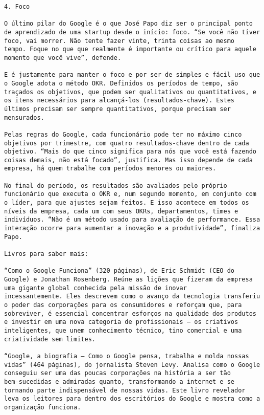 \begin{verbatim}
4. Foco

O último pilar do Google é o que José Papo diz ser o principal ponto
de aprendizado de uma startup desde o início: foco. “Se você não tiver
foco, vai morrer. Não tente fazer vinte, trinta coisas ao mesmo
tempo. Foque no que que realmente é importante ou crítico para aquele
momento que você vive”, defende.

E é justamente para manter o foco e por ser de simples e fácil uso que
o Google adota o método OKR. Definidos os períodos de tempo, são
traçados os objetivos, que podem ser qualitativos ou quantitativos, e
os itens necessários para alcançá-los (resultados-chave). Estes
últimos precisam ser sempre quantitativos, porque precisam ser
mensurados.

Pelas regras do Google, cada funcionário pode ter no máximo cinco
objetivos por trimestre, com quatro resultados-chave dentro de cada
objetivo. “Mais do que cinco significa para nós que você está fazendo
coisas demais, não está focado”, justifica. Mas isso depende de cada
empresa, há quem trabalhe com períodos menores ou maiores.

No final do período, os resultados são avaliados pelo próprio
funcionário que executa o OKR e, num segundo momento, em conjunto com
o líder, para que ajustes sejam feitos. E isso acontece em todos os
níveis da empresa, cada um com seus OKRs, departamentos, times e
indivíduos. “Não é um método usado para avaliação de performance. Essa
interação ocorre para aumentar a inovação e a produtividade”, finaliza
Papo.

Livros para saber mais:

“Como o Google Funciona” (320 páginas), de Eric Schmidt (CEO do
Google) e Jonathan Rosenberg. Reúne as lições que fizeram da empresa
uma gigante global conhecida pela missão de inovar
incessantemente. Eles descrevem como o avanço da tecnologia transferiu
o poder das corporações para os consumidores e reforçam que, para
sobreviver, é essencial concentrar esforços na qualidade dos produtos
e investir em uma nova categoria de profissionais – os criativos
inteligentes, que unem conhecimento técnico, tino comercial e uma
criatividade sem limites.

“Google, a biografia – Como o Google pensa, trabalha e molda nossas
vidas” (464 páginas), do jornalista Steven Levy. Analisa como o Google
conseguiu ser uma das poucas corporações na história a ser tão
bem-sucedidas e admiradas quanto, transformando a internet e se
tornando parte indispensável de nossas vidas. Este livro revelador
leva os leitores para dentro dos escritórios do Google e mostra como a
organização funciona.


\end{verbatim}